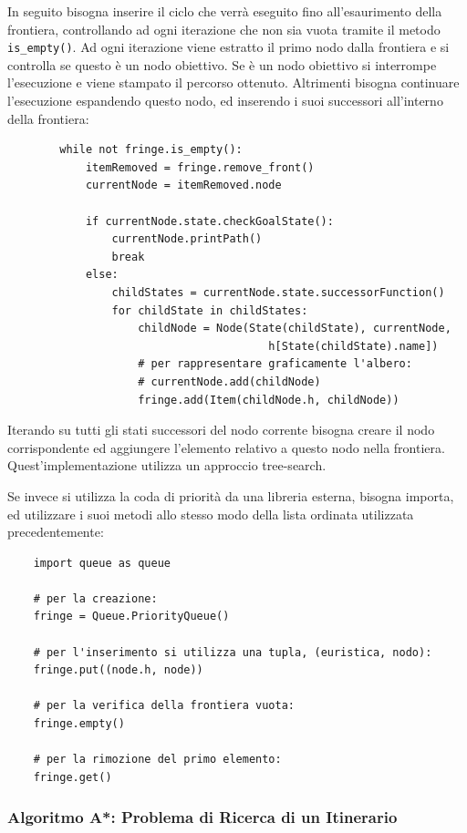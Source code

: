 \documentclass{article}
\numberwithin{equation}{subsection}
\begin{document}
In seguito bisogna inserire il ciclo che verrà eseguito fino all'esaurimento della frontiera, 
controllando ad ogni iterazione che non sia vuota tramite il metodo \verb|is_empty()|. 
Ad ogni iterazione viene estratto il primo nodo dalla frontiera e si controlla se questo è 
un nodo obiettivo. Se è un nodo obiettivo si interrompe l'esecuzione e viene stampato il 
percorso ottenuto. 
Altrimenti bisogna continuare l'esecuzione espandendo questo nodo, ed inserendo i suoi 
successori all'interno della frontiera:

\begin{verbatim}
        while not fringe.is_empty():
            itemRemoved = fringe.remove_front()
            currentNode = itemRemoved.node

            if currentNode.state.checkGoalState():
                currentNode.printPath()
                break
            else: 
                childStates = currentNode.state.successorFunction()
                for childState in childStates:
                    childNode = Node(State(childState), currentNode, 
                                        h[State(childState).name])
                    # per rappresentare graficamente l'albero:
                    # currentNode.add(childNode) 
                    fringe.add(Item(childNode.h, childNode))
\end{verbatim}

Iterando su tutti gli stati successori del nodo corrente bisogna creare il nodo corrispondente 
ed aggiungere l'elemento relativo a questo nodo nella frontiera. 
Quest'implementazione utilizza un approccio tree-search. 

Se invece si utilizza la coda di priorità da una libreria esterna, bisogna importa, 
ed utilizzare i suoi metodi allo stesso modo della lista ordinata utilizzata 
precedentemente:
\begin{verbatim}
    import queue as queue

    # per la creazione:
    fringe = Queue.PriorityQueue()

    # per l'inserimento si utilizza una tupla, (euristica, nodo):
    fringe.put((node.h, node))

    # per la verifica della frontiera vuota:
    fringe.empty()

    # per la rimozione del primo elemento:
    fringe.get()
\end{verbatim}

\subsubsection{Algoritmo A*: Problema di Ricerca di un Itinerario}
\end{document}
